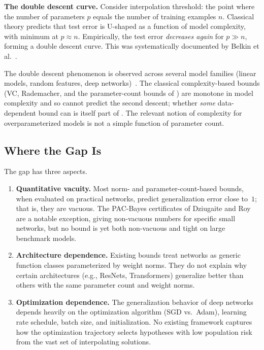 \begin{computational}
\textbf{The double descent curve.}  Consider interpolation threshold: the
point where the number of parameters $p$ equals the number of training
examples $n$.  Classical theory predicts that test error is U-shaped
as a function of model complexity, with minimum at $p \approx n$.
Empirically, the test error \emph{decreases again} for $p \gg n$,
forming a double descent curve.  This was systematically documented
by Belkin et al.~\cite{BelkinHsuMaMandal2019}.

The double descent phenomenon is observed across several model families
(linear models, random features, deep networks)~\cite{BelkinHsuMaMandal2019}.
The classical complexity-based bounds (VC, Rademacher, and the parameter-count
bounds of ) are monotone in model complexity and so
cannot predict the second descent; whether \emph{some} data-dependent bound can
is itself part of .  The relevant notion of complexity for
overparameterized models is not a simple function of parameter count.
\end{computational}

\subsection{Where the Gap Is}

The gap has three aspects.

\begin{enumerate}[leftmargin=*]
\item \textbf{Quantitative vacuity.}  Most norm- and parameter-count-based
  bounds, when evaluated on practical networks, predict generalization error
  close to~$1$; that is, they are vacuous.  The PAC-Bayes certificates of
  Dziugaite and Roy~\cite{DziugaiteRoy2017} are a notable exception, giving
  non-vacuous numbers for specific small networks, but no bound is yet both
  non-vacuous and tight on large benchmark models.

\item \textbf{Architecture dependence.}  Existing bounds treat networks as
  generic function classes parameterized by weight norms.  They do not
  explain why certain architectures (e.g., ResNets, Transformers)
  generalize better than others with the same parameter count and weight
  norms.

\item \textbf{Optimization dependence.}  The generalization behavior of deep
  networks depends heavily on the optimization algorithm (SGD vs.\ Adam),
  learning rate schedule, batch size, and initialization.  No existing
  framework captures how the optimization trajectory selects hypotheses
  with low population risk from the vast set of interpolating solutions.
\end{enumerate}

